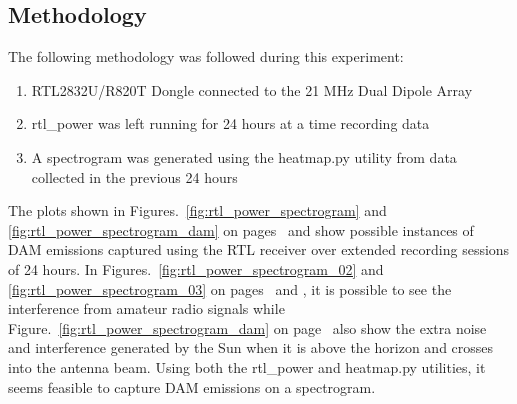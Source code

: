 \subsection*{Methodology}
The following methodology was followed during this experiment:

\begin{enumerate}
	\item RTL2832U/R820T Dongle connected to the 21 MHz Dual Dipole Array
	\item rtl\_power was left running for 24 hours at a time recording data
	\item A spectrogram was generated using the heatmap.py utility from data collected in the previous 24 hours
\end{enumerate}

The plots shown in Figures.~\ref{fig:rtl_power_spectrogram} and \ref{fig:rtl_power_spectrogram_dam} on pages~\pageref{fig:rtl_power_spectrogram} and \pageref{fig:rtl_power_spectrogram_dam} show possible instances of \gls{DAM} emissions captured using the RTL receiver over extended recording sessions of 24 hours. In Figures.~\ref{fig:rtl_power_spectrogram_02} and \ref{fig:rtl_power_spectrogram_03} on pages~\pageref{fig:rtl_power_spectrogram_02} and \pageref{fig:rtl_power_spectrogram_03}, it is possible to see the interference from amateur radio signals while Figure.~\ref{fig:rtl_power_spectrogram_dam} on page~\pageref{fig:rtl_power_spectrogram_dam} also show the extra noise and interference generated by the Sun when it is above the horizon and crosses into the antenna beam. Using both the rtl\_power and heatmap.py utilities, it seems feasible to capture \gls{DAM} emissions on a spectrogram.

